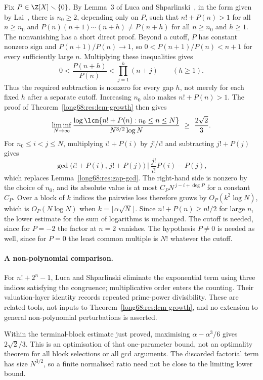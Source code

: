 \begin{remark}
Fix $P\in\Z[X]\smallsetminus\{0\}$.  By Lemma~3 of Luca and
Shparlinski~\cite{luca-shparlinski}, in the form given by
Lai~\cite[Lemma~2.1]{lai}, there is $n_0\ge2$, depending only on $P$, such
that $n!+P(n)>1$ for all $n\ge n_0$ and $P(n)(n+1)\cdots(n+h)\ne P(n+h)$ for
all $n\ge n_0$ and $h\ge1$. The nonvanishing has a short direct proof.
Beyond a cutoff, $P$ has constant nonzero sign and
$P(n+1)/P(n)\to1$, so $0<P(n+1)/P(n)<n+1$ for every sufficiently
large $n$. Multiplying these inequalities gives
\[
 0<\frac{P(n+h)}{P(n)}<\prod_{j=1}^{h}(n+j)\qquad(h\ge1).
\]
Thus the required subtraction is nonzero for every gap $h$, not merely
for each fixed $h$ after a separate cutoff. Increasing $n_0$ also makes
$n!+P(n)>1$. The proof of Theorem~\ref{long68:res:lcm-growth} then gives
\[
 \liminf_{N\to\infty}
 \frac{\log\lcm\{n!+P(n):n_0\le n\le N\}}{N^{3/2}\log N}
 \ \ge\ \frac{2\sqrt2}{3}.
\]
For $n_0\le i<j\le N$, multiplying $i!+P(i)$ by $j!/i!$ and subtracting
$j!+P(j)$ gives
\[
 \gcd\bigl(i!+P(i),\,j!+P(j)\bigr)\ \Big|\ \frac{j!}{i!}P(i)-P(j),
\]
which replaces Lemma~\ref{long68:res:gap-gcd}.  The right-hand side is
nonzero by the choice of $n_0$, and its absolute value is at most
$C_PN^{\,j-i+\deg P}$ for a constant $C_P$.  Over a block of $k$ indices the
pairwise loss therefore grows by $O_P(k^2\log N)$, which is $O_P(N\log N)$
when $k=\lfloor\alpha\sqrt N\rfloor$.  Since $n!+P(n)\ge n!/2$ for large $n$,
the lower estimate for the sum of logarithms is unchanged.  The cutoff is
needed, since for $P=-2$ the factor at $n=2$ vanishes.  The hypothesis
$P\ne0$ is needed as well, since for $P=0$ the least common multiple is $N!$
whatever the cutoff.
\end{remark}

\paragraph{A non-polynomial comparison.}
For $n!+2^n-1$, Luca and Shparlinski
\cite[Lemmas~2.1--2.3, pp.~860--862]{luca-shparlinski-exp} eliminate the
exponential term using three indices satisfying the congruence; multiplicative order enters the counting.
Their valuation-layer identity \cite[(3.2), p.~863]{luca-shparlinski-exp}
records repeated prime-power divisibility.  These are related tools, not
inputs to Theorem~\ref{long68:res:lcm-growth}, and no extension to general
non-polynomial perturbations is asserted.

Within the terminal-block estimate just proved, maximising
$\alpha-\alpha^3/6$ gives $2\sqrt2/3$.  This is an optimisation of that
one-parameter bound, not an optimality theorem for all block selections or
all gcd arguments.  The discarded factorial term has size $N^{3/2}$,
so a finite normalised ratio need not be close to the limiting lower bound.

